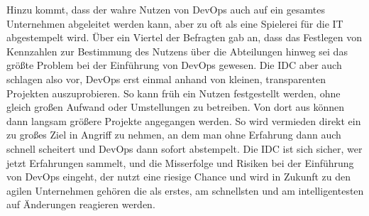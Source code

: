 Hinzu kommt, dass der wahre Nutzen von DevOps auch auf ein gesamtes Unternehmen abgeleitet werden kann, aber zu oft als eine Spielerei für die IT abgestempelt wird. Über ein Viertel der Befragten gab an, dass das Festlegen von Kennzahlen zur Bestimmung des Nutzens über die Abteilungen hinweg sei das größte Problem bei der Einführung von DevOps gewesen. Die \ac{IDC} aber auch \citeauthor*{halstenberg:2020} \cite{halstenberg:2020} schlagen also vor, DevOps erst einmal anhand von kleinen, transparenten Projekten auszuprobieren. So kann früh ein Nutzen festgestellt werden, ohne gleich großen Aufwand oder Umstellungen zu betreiben. Von dort aus können dann langsam größere Projekte angegangen werden. So wird vermieden direkt ein zu großes Ziel in Angriff zu nehmen, an dem man ohne Erfahrung dann auch schnell scheitert und DevOps dann sofort abstempelt. Die \ac{IDC} ist sich sicher, wer jetzt Erfahrungen sammelt, und die Misserfolge und Risiken bei der Einführung von DevOps eingeht, der nutzt eine riesige Chance und wird in Zukunft zu den agilen Unternehmen gehören \glqq die als erstes, am schnellsten und am intelligentesten auf Änderungen reagieren werden.\grqq \cite{idc:2020}
